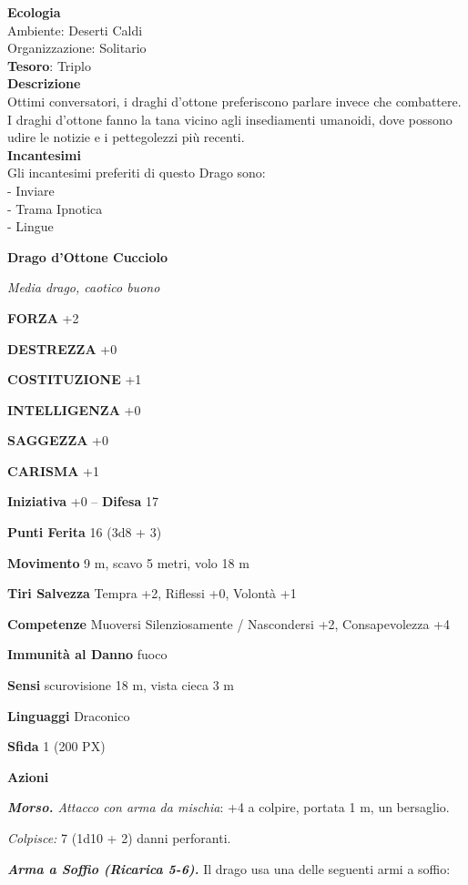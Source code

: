 \begin{multicols}{2}
	\textbf{Ecologia}\\
	Ambiente: Deserti Caldi\\
	Organizzazione: Solitario\\
	\textbf{Tesoro}: Triplo\\
	\textbf{Descrizione}\\
	Ottimi conversatori, i draghi d'ottone preferiscono parlare invece che combattere. I draghi d'ottone fanno la tana vicino agli insediamenti umanoidi, dove possono udire le notizie e i pettegolezzi più recenti.\\
	\textbf{Incantesimi}\\
	Gli incantesimi preferiti di questo Drago sono:\\
	- Inviare\\
	- Trama Ipnotica\\
	- Lingue

	\medskip{}\textbf{Drago d'Ottone Cucciolo}

	\textit{Media drago, caotico buono}

	\textbf{FORZA} +2

	\textbf{DESTREZZA} +0

	\textbf{COSTITUZIONE} +1

	\textbf{INTELLIGENZA} +0

	\textbf{SAGGEZZA} +0

	\textbf{CARISMA} +1

	\textbf{Iniziativa} +0 -- \textbf{Difesa} 17

	\textbf{Punti Ferita} 16 (3d8 + 3)

	\textbf{Movimento} 9 m, scavo 5 metri, volo 18 m

	\textbf{Tiri Salvezza} Tempra +2, Riflessi +0, Volontà +1

	\textbf{Competenze} Muoversi Silenziosamente / Nascondersi +2, Consapevolezza +4

	\textbf{Immunità al Danno} fuoco

	\textbf{Sensi} scurovisione 18 m, vista cieca 3 m

	\textbf{Linguaggi} Draconico

	\textbf{Sfida} 1 (200 PX)

	\textbf{Azioni}

	\textit{\textbf{Morso.} Attacco con arma da mischia}: +4 a colpire, portata 1 m, un bersaglio.

	\textit{Colpisce:} 7 (1d10 + 2) danni perforanti.

	\textit{\textbf{Arma a Soffio (Ricarica 5-6).}} Il drago usa una delle seguenti armi a soffio:


\end{multicols}
